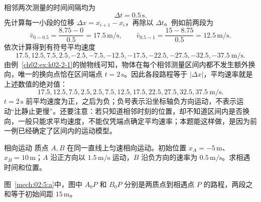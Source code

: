 {\begin{xesolution}
相邻两次测量的时间间隔均为
\[
 \Delta t=0.5\,\mathrm s.
\]
先计算每一小段的位移 $\Delta x=x_{i+1}-x_i$，再除以 $\Delta t$。例如前两段为
\[
 \bar v_{0\sim0.5}=\frac{8.75-0}{0.5}=17.5\,\mathrm{m/s},
 \qquad
 \bar v_{0.5\sim1}=\frac{15-8.75}{0.5}=12.5\,\mathrm{m/s}.
\]
依次计算得到有符号平均速度
\[
17.5,12.5,7.5,2.5,-2.5,-7.5,-12.5,-17.5,-22.5,-27.5,-32.5,-37.5\ \mathrm{m/s}.
\]
由例~\ref{ch02:ex:k02-2-1}的抛物线可知，物体在每个相邻测量区间内都不发生额外换向，唯一的换向点恰在区间端点 $t=2\,\mathrm s$。因此各段路程等于 $|\Delta x|$，平均速率就是上述数值的绝对值：
\[
\boxed{17.5,12.5,7.5,2.5,2.5,7.5,12.5,17.5,22.5,27.5,32.5,37.5\ \mathrm{m/s}}.
\]
$t=2\,\mathrm{s}$ 前平均速度为正，之后为负；负号表示沿坐标轴负方向运动，不表示运动“比静止更慢”。还要注意：若只知道相邻时刻的位置，却不知道区间内是否换向，一般只能求平均速度，不能仅凭端点确定平均速率；本题能这样做，是因为前一例已经确定了区间内的运动模型。
\end{xesolution}

\begin{origexamplebox}{相向运动}\label{ch02:ex:k02-2-5}
质点 $A,B$ 在同一直线上匀速相向运动。初始位置 $x_A=-5\,\mathrm m$、$x_B=10\,\mathrm m$；$A$ 沿正方向以 $1.5\,\mathrm{m/s}$ 运动，$B$ 沿负方向的速率为 $0.5\,\mathrm{m/s}$。求相遇时间和位置。

\begin{qualityfigure}
\label{mech:02:5:q}
\end{qualityfigure}
\end{origexamplebox}
\begin{xesolution}
\begin{qualityfigure}
\label{mech:02:5:a}
\end{qualityfigure}
图~\ref{mech:02:5:a}中，图中 $A_0P$ 和 $B_0P$ 分别是两质点到相遇点 $P$ 的路程，两段之和等于初始间距 $15\,\mathrm m$。


\end{xesolution}}
